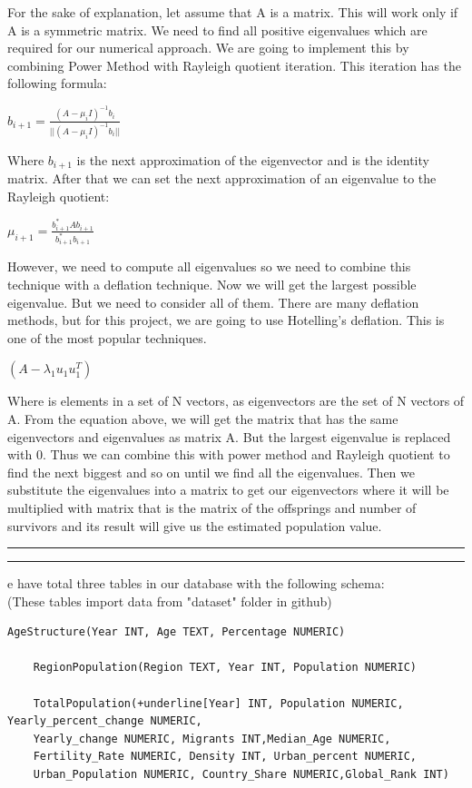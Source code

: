 \documentclass[a4paper, 11pt]{article}
\newcommand{\question}[2] {\vspace{.25in} \hrule\vspace{0.5em}
\noindent{\bf #1: #2} \vspace{0.5em}
\hrule \vspace{.10in}}
\begin{document}
 For the sake of explanation, let assume that A is a matrix. This will work only if A is a symmetric matrix. We need to find all positive eigenvalues which are required for our numerical approach. We are going to implement this by combining Power Method with Rayleigh quotient iteration. This iteration has the following formula:
 \begin{center}
     $b_{i+1} = \frac{(A-\mu_{i}I)^{-1}b_{i}}{||(A-\mu_{i}I)^{-1}b_{i}||} $ 
 \end{center}
Where $b_{i+1}$ is the next approximation of the eigenvector and  is the identity matrix. After that we can set the next approximation of an eigenvalue to the Rayleigh quotient:
 \begin{center}
$\mu_{i+1} = \frac{b^{*}_{i+1}Ab_{i+1}}{b^{*}_{i+1}b_{i+1}}$
 \end{center}
However, we need to compute all eigenvalues so we need to combine this technique with a deflation technique. Now we will get the largest possible eigenvalue. But we need to consider all of them. There are many deflation methods, but for this project, we are going to use Hotelling’s deflation. This is one of the most popular techniques.
 \begin{center}
$(A-\lambda_{1}u_{1}u_{1}^{T})$
\end{center}
Where  is elements in a set of N vectors, as eigenvectors are the set of N vectors of A. From the equation above, we will get the matrix that has the same eigenvectors and eigenvalues as matrix A. But the largest eigenvalue is replaced with 0. Thus we can combine this with power method and Rayleigh quotient to find the next biggest and so on until we find all the eigenvalues. Then we substitute the eigenvalues into a matrix to get our eigenvectors where it will be multiplied with  matrix that is the matrix of the offsprings and number of survivors and its result will give us the estimated population value.\\

\question{Database schema}

We have total three tables in our database with the following schema:\\
(These tables import data from "dataset" folder in github)
\begin{Verbatim}[commandchars=+\[\]]
    AgeStructure(Year INT, Age TEXT, Percentage NUMERIC)
    
    RegionPopulation(Region TEXT, Year INT, Population NUMERIC)
    
    TotalPopulation(+underline[Year] INT, Population NUMERIC, Yearly_percent_change NUMERIC, 
    Yearly_change NUMERIC, Migrants INT,Median_Age NUMERIC, 
    Fertility_Rate NUMERIC, Density INT, Urban_percent NUMERIC,
    Urban_Population NUMERIC, Country_Share NUMERIC,Global_Rank INT)
\end{Verbatim}
\end{document}
